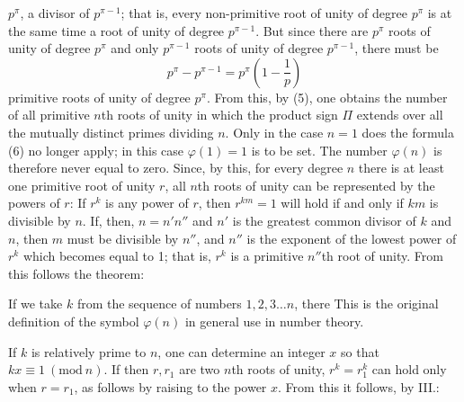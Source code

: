 $p^\pi$, a divisor of $p^{\pi-1}$; that is, every non-primitive root of unity of degree $p^\pi$ is at the same time a root of unity of degree $p^{\pi-1}$. But since there are $p^\pi$ roots of unity of degree $p^\pi$ and only $p^{\pi-1}$ roots of unity of degree $p^{\pi-1}$, there must be
\[
p^\pi - p^{\pi-1} = p^\pi \left(1 - \frac{1}{p}\right)
\]
primitive roots of unity of degree $p^\pi$. From this, by (5), one obtains the number of all primitive $n$th roots of unity
in which the product sign $\Pi$ extends over all the mutually distinct primes dividing $n$. Only in the case $n = 1$ does the formula (6) no longer apply; in this case $\varphi(1) = 1$ is to be set. The number $\varphi(n)$ is therefore never equal to zero. Since, by this, for every degree $n$ there is at least one primitive root of unity $r$, all $n$th roots of unity can be represented by the powers of $r$:
If $r^k$ is any power of $r$, then $r^{km} = 1$ will hold if and only if $km$ is divisible by $n$. If, then, $n = n'n''$ and $n'$ is the greatest common divisor of $k$ and $n$, then $m$ must be divisible by $n''$, and $n''$ is the exponent of the lowest power of $r^k$ which becomes equal to 1; that is, $r^k$ is a primitive $n''$th root of unity. From this follows the theorem:


If we take $k$ from the sequence of numbers $1, 2, 3 \ldots n$, there  This is the original definition of the symbol $\varphi(n)$ in general use in number theory.

If $k$ is relatively prime to $n$, one can determine an integer $x$ so that $kx \equiv 1\ (\mathrm{mod}\ n)$. If then $r, r_1$ are two $n$th roots of unity, $r^k = r_1^k$ can hold only when $r = r_1$, as follows by raising to the power $x$. From this it follows, by III.:
